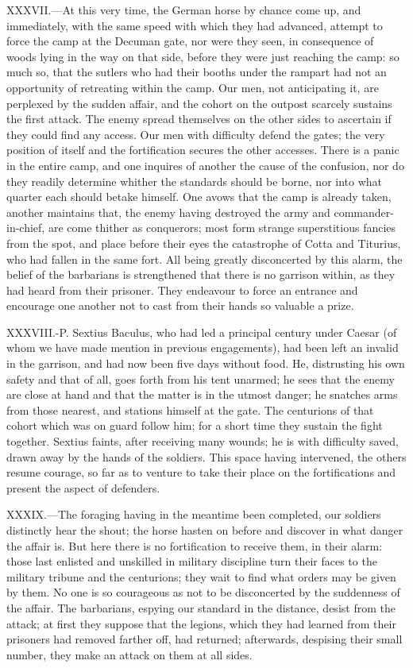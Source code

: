XXXVII.—At this very time, the German horse by chance come up, and
immediately, with the same speed with which they had advanced, attempt
to force the camp at the Decuman gate, nor were they seen, in
consequence of woods lying in the way on that side, before they were
just reaching the camp: so much so, that the sutlers who had their
booths under the rampart had not an opportunity of retreating within the
camp. Our men, not anticipating it, are perplexed by the sudden affair,
and the cohort on the outpost scarcely sustains the first attack. The
enemy spread themselves on the other sides to ascertain if they could
find any access. Our men with difficulty defend the gates; the very
position of itself and the fortification secures the other accesses.
There is a panic in the entire camp, and one inquires of another the
cause of the confusion, nor do they readily determine whither the
standards should be borne, nor into what quarter each should betake
himself. One avows that the camp is already taken, another maintains
that, the enemy having destroyed the army and commander-in-chief, are
come thither as conquerors; most form strange superstitious fancies from
the spot, and place before their eyes the catastrophe of Cotta and
Titurius, who had fallen in the same fort. All being greatly
disconcerted by this alarm, the belief of the barbarians is strengthened
that there is no garrison within, as they had heard from their prisoner.
They endeavour to force an entrance and encourage one another not to
cast from their hands so valuable a prize.

XXXVIII.-P. Sextius Baculus, who had led a principal century under
Caesar (of whom we have made mention in previous engagements), had been
left an invalid in the garrison, and had now been five days without
food. He, distrusting his own safety and that of all, goes forth from
his tent unarmed; he sees that the enemy are close at hand and that the
matter is in the utmost danger; he snatches arms from those nearest, and
stations himself at the gate. The centurions of that cohort which was on
guard follow him; for a short time they sustain the fight together.
Sextius faints, after receiving many wounds; he is with difficulty
saved, drawn away by the hands of the soldiers. This space having
intervened, the others resume courage, so far as to venture to take
their place on the fortifications and present the aspect of defenders.

XXXIX.—The foraging having in the meantime been completed, our soldiers
distinctly hear the shout; the horse hasten on before and discover in
what danger the affair is. But here there is no fortification to receive
them, in their alarm: those last enlisted and unskilled in military
discipline turn their faces to the military tribune and the centurions;
they wait to find what orders may be given by them. No one is so
courageous as not to be disconcerted by the suddenness of the affair.
The barbarians, espying our standard in the distance, desist from the
attack; at first they suppose that the legions, which they had learned
from their prisoners had removed farther off, had returned; afterwards,
despising their small number, they make an attack on them at all sides.

